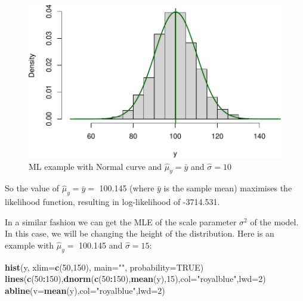 \documentclass[
]{book}
\newenvironment{Shaded}{\begin{snugshade}}{\end{snugshade}}
\newcommand{\AttributeTok}[1]{\textcolor[rgb]{0.13,0.29,0.53}{#1}}
\newcommand{\ConstantTok}[1]{\textcolor[rgb]{0.56,0.35,0.01}{#1}}
\newcommand{\DecValTok}[1]{\textcolor[rgb]{0.00,0.00,0.81}{#1}}
\newcommand{\FunctionTok}[1]{\textcolor[rgb]{0.13,0.29,0.53}{\textbf{#1}}}
\newcommand{\NormalTok}[1]{#1}
\newcommand{\SpecialCharTok}[1]{\textcolor[rgb]{0.81,0.36,0.00}{\textbf{#1}}}
\newcommand{\StringTok}[1]{\textcolor[rgb]{0.31,0.60,0.02}{#1}}
\theoremstyle{definition}
\theoremstyle{definition}
\theoremstyle{definition}
\theoremstyle{definition}
\theoremstyle{remark}
\begin{document}
\begin{figure}
\centering
\includegraphics{Svetunkov---Statistics-for-Business-Analytics_files/figure-latex/MLENormalExample04-1.pdf}
\caption{\label{fig:MLENormalExample04}ML example with Normal curve and \(\hat{\mu}_y=\bar{y}\) and \(\hat{\sigma}=10\)}
\end{figure}

So the value of \(\hat{\mu}_y=\bar{y}=\) 100.145 (where \(\bar{y}\) is the sample mean) maximises the likelihood function, resulting in log-likelihood of -3714.531.

In a similar fashion we can get the MLE of the scale parameter \(\sigma^2\) of the model. In this case, we will be changing the height of the distribution. Here is an example with \(\hat{\mu}_y=\) 100.145 and \(\hat{\sigma}=15\):

\begin{Shaded}
\begin{Highlighting}[]
\FunctionTok{hist}\NormalTok{(y, }\AttributeTok{xlim=}\FunctionTok{c}\NormalTok{(}\DecValTok{50}\NormalTok{,}\DecValTok{150}\NormalTok{), }\AttributeTok{main=}\StringTok{""}\NormalTok{, }\AttributeTok{probability=}\ConstantTok{TRUE}\NormalTok{)}
\FunctionTok{lines}\NormalTok{(}\FunctionTok{c}\NormalTok{(}\DecValTok{50}\SpecialCharTok{:}\DecValTok{150}\NormalTok{),}\FunctionTok{dnorm}\NormalTok{(}\FunctionTok{c}\NormalTok{(}\DecValTok{50}\SpecialCharTok{:}\DecValTok{150}\NormalTok{),}\FunctionTok{mean}\NormalTok{(y),}\DecValTok{15}\NormalTok{),}\AttributeTok{col=}\StringTok{"royalblue"}\NormalTok{,}\AttributeTok{lwd=}\DecValTok{2}\NormalTok{)}
\FunctionTok{abline}\NormalTok{(}\AttributeTok{v=}\FunctionTok{mean}\NormalTok{(y),}\AttributeTok{col=}\StringTok{"royalblue"}\NormalTok{,}\AttributeTok{lwd=}\DecValTok{2}\NormalTok{)}
\end{Highlighting}
\end{Shaded}
\end{document}
